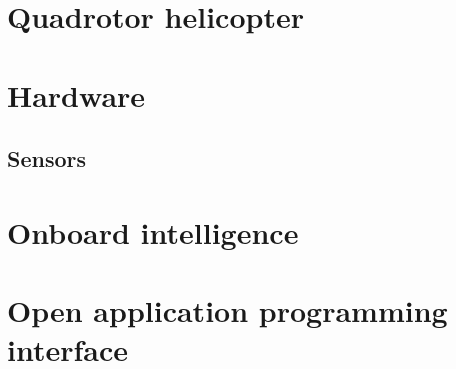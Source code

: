 	\section{Quadrotor helicopter}
	\section{Hardware}
		\subsection{Sensors}
	\section{Onboard intelligence}
	\section{Open application programming interface}
